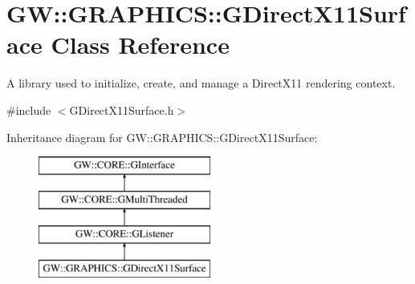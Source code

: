 \hypertarget{class_g_w_1_1_g_r_a_p_h_i_c_s_1_1_g_direct_x11_surface}{}\section{GW\+:\+:G\+R\+A\+P\+H\+I\+CS\+:\+:G\+Direct\+X11\+Surface Class Reference}
\label{class_g_w_1_1_g_r_a_p_h_i_c_s_1_1_g_direct_x11_surface}


A library used to initialize, create, and manage a Direct\+X11 rendering context.  




{\ttfamily \#include $<$G\+Direct\+X11\+Surface.\+h$>$}

Inheritance diagram for GW\+:\+:G\+R\+A\+P\+H\+I\+CS\+:\+:G\+Direct\+X11\+Surface\+:\begin{figure}[H]
\begin{center}
\leavevmode
\includegraphics[height=4.000000cm]{class_g_w_1_1_g_r_a_p_h_i_c_s_1_1_g_direct_x11_surface}
\end{center}
\end{figure}
